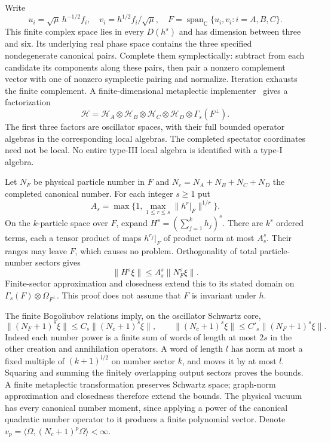 Write
\[
 u_i=\sqrt\mu\,h^{-1/2}f_i,\quad v_i=h^{1/2}f_i/\sqrt\mu,
 \quad F=\operatorname{span}_{\mathbb C}\{u_i,v_i:i=A,B,C\}.
\]
This finite complex space lies in every $D(h^s)$ and has dimension between three and six. Its underlying real phase space contains the three specified nondegenerate canonical pairs. Complete them symplectically: subtract from each candidate its components along these pairs, then pair a nonzero complement vector with one of nonzero symplectic pairing and normalize. Iteration exhausts the finite complement. A finite-dimensional metaplectic implementer~\cite[Section 2.4]{Derezinski} gives a factorization
\[
 \mathcal H=\mathcal H_A\otimes\mathcal H_B\otimes\mathcal H_C
       \otimes\mathcal H_D\otimes\Gamma_s(F^\perp).
\]
The first three factors are oscillator spaces, with their full bounded operator algebras in the corresponding local algebras. The completed spectator coordinates need not be local. No entire type-III local algebra is identified with a type-I algebra.

Let $N_F$ be physical particle number in $F$ and $N_c=N_A+N_B+N_C+N_D$ the completed canonical number. For each integer $s\ge1$ put
\[
 A_s=\max\{1,\max_{1\le r\le s}\|h^r|_F\|^{1/r}\}.
\]
On the $k$-particle space over $F$, expand $H^s=(\sum_{j=1}^k h_j)^s$. There are $k^s$ ordered terms, each a tensor product of maps $h^{r_j}|_F$ of product norm at most $A_s^s$. Their ranges may leave $F$, which causes no problem. Orthogonality of total particle-number sectors gives
\begin{equation}\label{eq:field-energy-domain}
 \|H^s\xi\|\le A_s^s\|N_F^s\xi\|.
\end{equation}
Finite-sector approximation and closedness extend this to its stated domain on $\Gamma_s(F)\otimes\Omega_{F^\perp}$. This proof does not assume that $F$ is invariant under $h$.

The finite Bogoliubov relations imply, on the oscillator Schwartz core,
\begin{equation}\label{eq:number-equivalence}
 \|(N_F+1)^s\xi\|\le C_s\|(N_c+1)^s\xi\|,
 \qquad \|(N_c+1)^s\xi\|\le C'_s\|(N_F+1)^s\xi\|.
\end{equation}
Indeed each number power is a finite sum of words of length at most $2s$ in the other creation and annihilation operators. A word of length $l$ has norm at most a fixed multiple of $(k+1)^{l/2}$ on number sector $k$, and moves it by at most $l$. Squaring and summing the finitely overlapping output sectors proves the bounds. A finite metaplectic transformation preserves Schwartz space; graph-norm approximation and closedness therefore extend the bounds. The physical vacuum has every canonical number moment, since applying a power of the canonical quadratic number operator to it produces a finite polynomial vector. Denote $v_p=\langle\Omega,(N_c+1)^p\Omega\rangle<\infty$.

